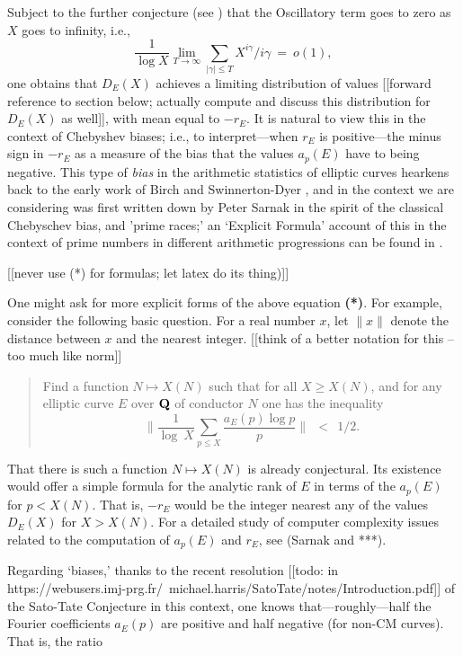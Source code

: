 \documentclass[11pt]{article}
\theoremstyle{plain}
\theoremstyle{definition}
\numberwithin{equation}{section}
\numberwithin{figure}{section}
\numberwithin{table}{section}
\def\Q{\bf{Q}}
\begin{document}
     Subject to the further conjecture  (see \cite{S})  that the Oscillatory term goes to zero as $X$ goes to infinity, i.e., $$ {\frac{1}{\log X}} \lim_{T\to \infty}\sum_{|\gamma | \le T}X^{i\gamma}/i\gamma  \ = \ o(1),$$  one obtains that  ${D}_E(X)$ achieves a limiting distribution of values [[forward reference to section below; actually compute and discuss this distribution for ${D}_E(X)$ as well]], with mean equal to $-r_E$.  It is natural to view this in the context of Chebyshev biases; i.e., to interpret---when $r_E$ is positive---the minus sign in $-r_E$ as a measure of the bias that the values $a_p(E)$ have to being negative. This type of {\it bias} in the arithmetic statistics of elliptic curves  hearkens back to the early work of Birch and Swinnerton-Dyer \cite{S}, and in the context we are considering was  first written down by Peter Sarnak  in the spirit of the classical Chebyschev bias, and 'prime races;' an `Explicit Formula' account of this in the context of  prime numbers in different arithmetic progressions can be found in {\cite{GM}}.

     [[never use (*) for formulas; let latex do its thing)]]

    One might ask for more explicit forms of the above equation {\bf (*)}.   For example, consider the following basic question.  For a real number $x$,  let  $\|x\|$ denote the distance between $x$ and the nearest integer. [[think of a better notation for this  -- too much like norm]]

   \begin{quote}  Find a function $N \mapsto X(N)$ such that for all $X \ge X(N)$, and for any elliptic curve $E$ over ${\Q}$ of conductor $N$ one has   the inequality
   $$\|{\frac{1}{\log\ X}}\sum_{p \le X}{\frac{a_E(p)\log p}{ p}}\| \ \ < \ \ 1/2.$$ \end{quote}

 That there is such a function $N \mapsto X(N)$ is already conjectural. Its existence would offer a simple formula for the analytic rank of $E$  in terms of the $a_p(E)$ for $p < X(N)$.   That is, $-r_E$ would be the integer nearest any of the values $D_E(X)$ for $X >X(N)$.   For a detailed study of computer complexity issues related to the computation of   $a_p(E)$ and $r_E$, see (Sarnak and ***).

 Regarding `biases,'  thanks to the recent resolution \cite{} [[todo: in https://webusers.imj-prg.fr/~michael.harris/SatoTate/notes/Introduction.pdf]] of the Sato-Tate Conjecture in this context, one knows that---roughly---half the Fourier coefficients  $a_E(p)$ are positive and half negative (for non-CM curves). That is,  the ratio
\end{document}
